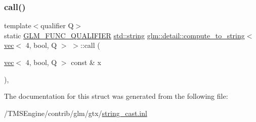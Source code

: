 \subsubsection{\texorpdfstring{call()}{call()}}
{\footnotesize\ttfamily template$<$qualifier Q$>$ \\
static \hyperlink{setup_8hpp_a33fdea6f91c5f834105f7415e2a64407}{G\+L\+M\+\_\+\+F\+U\+N\+C\+\_\+\+Q\+U\+A\+L\+I\+F\+I\+ER} \hyperlink{_s_d_l__opengl__glext_8h_ae84541b4f3d8e1ea24ec0f466a8c568b}{std\+::string} \hyperlink{structglm_1_1detail_1_1compute__to__string}{glm\+::detail\+::compute\+\_\+to\+\_\+string}$<$ \hyperlink{structglm_1_1vec}{vec}$<$ 4, bool, Q $>$ $>$\+::call (\begin{DoxyParamCaption}\item[{\hyperlink{structglm_1_1vec}{vec}$<$ 4, bool, Q $>$ const \&}]{x }\end{DoxyParamCaption})\hspace{0.3cm}{\ttfamily [inline]}, {\ttfamily [static]}}



The documentation for this struct was generated from the following file\+:\begin{DoxyCompactItemize}
\item 
/\+T\+M\+S\+Engine/contrib/glm/gtx/\hyperlink{string__cast_8inl}{string\+\_\+cast.\+inl}\end{DoxyCompactItemize}
